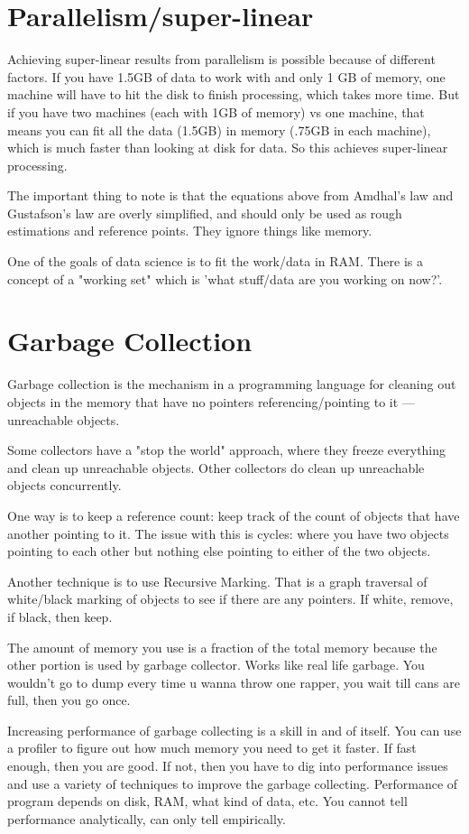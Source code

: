 \documentclass[twoside]{article}
\begin{document}
\section{Parallelism/super-linear}

Achieving super-linear results from parallelism is possible because of different factors. If you have 1.5GB of data to work with and only 1 GB of memory, one machine will have to hit the disk to finish processing, which takes more time. But if you have two machines (each with 1GB of memory) vs one machine, that means you can fit all the data (1.5GB) in memory (.75GB in each machine), which is much faster than looking at disk for data. So this achieves super-linear processing. 

The important thing to note is that the equations above from Amdhal's law and Gustafson's law are overly simplified, and should only be used as rough estimations and reference points. They ignore things like memory.

One of the goals of data science is to fit the work/data in RAM. There is a concept of a "working set" which is 'what stuff/data are you working on now?'.


\section{Garbage Collection}

Garbage collection is the mechanism in a programming language for cleaning out objects in the memory that have no pointers referencing/pointing to it — unreachable objects.

Some collectors have a "stop the world" approach, where they freeze everything and clean up unreachable objects. Other collectors do clean up unreachable objects concurrently. 

One way is to keep a reference count: keep track of the count of objects that have another pointing to it. The issue with this is cycles: where you have two objects pointing to each other but nothing else pointing to either of the two objects.


Another technique is to use Recursive Marking. That is a graph traversal of white/black marking of objects to see if there are any pointers. If white, remove, if black, then keep.

The amount of memory you use is a fraction of the total memory because the other portion is used by garbage collector. Works like real life garbage.  You wouldn’t go to dump every time u wanna throw one rapper, you wait till cans are full, then you go once.

Increasing performance of garbage collecting is a skill in and of itself. You can use a profiler to figure out how much memory you need to get it faster. If fast enough, then you are good. If not, then you have to dig into performance issues and use a variety of techniques to improve the garbage collecting. Performance of program depends on disk, RAM, what kind of data, etc. You cannot tell performance analytically, can only tell empirically.




\end{document}
